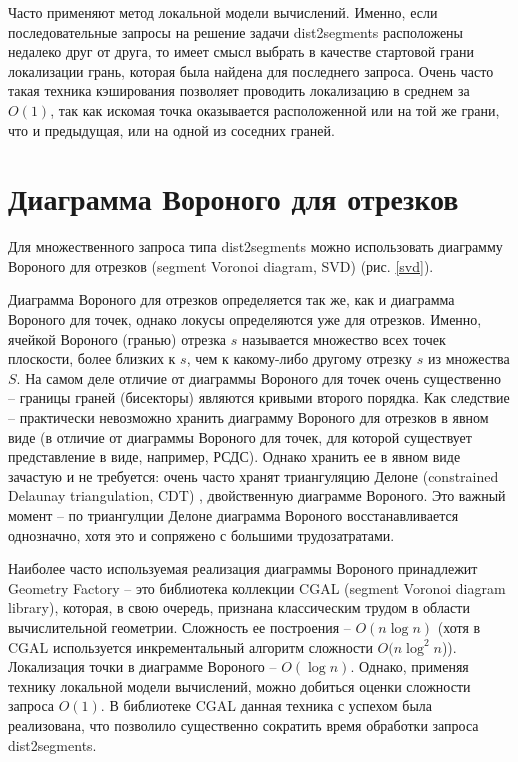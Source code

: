 Часто применяют метод локальной модели вычислений. Именно, если
последовательные запросы на решение задачи dist2segments расположены недалеко
друг от друга, то имеет смысл выбрать в качестве стартовой грани локализации
грань, которая была найдена для последнего запроса. Очень часто такая
техника кэширования позволяет проводить локализацию в среднем за $O(1)$, так как
искомая точка оказывается расположенной или на той же грани, что и
предыдущая, или на одной из соседних граней.

\section{Диаграмма Вороного для отрезков}

Для множественного запроса типа dist2segments можно использовать
диаграмму Вороного для отрезков (segment Voronoi diagram, SVD) \cite{SVD} (рис. \ref{svd}).


Диаграмма Вороного для отрезков определяется так же, как и диаграмма
Вороного для точек, однако локусы определяются уже для отрезков. Именно,
ячейкой Вороного (гранью) отрезка $s$ называется множество всех точек
плоскости, более близких к $s$, чем к какому-либо другому отрезку $s$ из
множества $S$. На самом деле отличие от диаграммы Вороного для точек очень
существенно -- границы граней (бисекторы) являются кривыми второго
порядка. Как следствие -- практически невозможно хранить диаграмму Вороного
для отрезков в явном виде (в отличие от диаграммы Вороного для точек, для которой существует
представление в виде, например, РСДС).
Однако хранить ее в явном виде зачастую и не требуется: очень часто
хранят триангуляцию Делоне (constrained Delaunay
triangulation, CDT) \cite{CGAL}, двойственную диаграмме Вороного. Это важный момент -- 
по триангулции Делоне диаграмма Вороного восстанавливается
однозначно, хотя это и сопряжено с большими трудозатратами.

Наиболее часто используемая реализация диаграммы Вороного принадлежит Geometry
Factory -- это библиотека коллекции CGAL \cite{CGAL} (segment Voronoi diagram library),
которая, в свою очередь, признана классическим трудом в области
вычислительной геометрии.
Сложность ее построения -- $O(n \log n)$ \cite{CGAL} (хотя в CGAL используется
инкрементальный алгоритм сложности $O(n \log^2 n$)). Локализация точки в диаграмме Вороного --
$O(\log n)$. Однако, применяя технику локальной модели вычислений, можно
добиться оценки сложности запроса $O(1)$.
В библиотеке CGAL данная техника с успехом была реализована, что
позволило существенно сократить время обработки запроса dist2segments.

